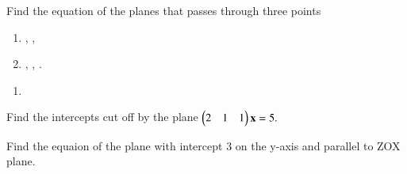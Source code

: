%
\item Find the equation of the planes that passes through three points
\begin{enumerate}
\item {}, , 
\item {}, , .
\end{enumerate}
\solution
\begin{enumerate}
    \item 

\end{enumerate}
\item Find the intercepts cut off by the plane 
$
\begin{pmatrix}2 & 1 & 1\end{pmatrix}\mathbf{x}=5.
$
\item Find the equaion of the plane with intercept 3 on the y-axis and parallel to ZOX plane.

